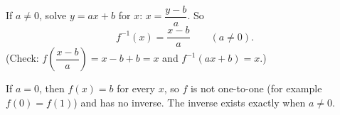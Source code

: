 If $a\ne0$, solve $y=ax+b$ for $x$: $x=\dfrac{y-b}{a}$. So
\[\boxed{f^{-1}(x)=\dfrac{x-b}{a}}\qquad(a\ne0).\]
(Check: $f\left(\dfrac{x-b}{a}\right)=x-b+b=x$ and $f^{-1}(ax+b)=x$.)

If $a=0$, then $f(x)=b$ for every $x$, so $f$ is not one-to-one (for example $f(0)=f(1)$) and has no inverse. The inverse exists exactly when $a\ne0$.
